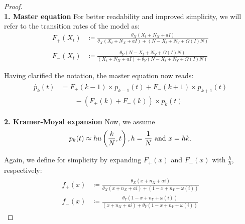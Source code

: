 \documentclass[12pt,a4paper,twoside]{article}
\begin{document}
\begin{proof}\phantom{lol}\\
	\textbf{1. Master equation}\newline
	For better readability and improved simplicity, we will refer to the transition rates of the model as:
	\begin{align*}
	F_+ \left(X_t\right) &\coloneqq\frac{\theta_X (X_t + N_X + aI)}{\theta_X (X_t + N_X + aI) + (N-X_t + N_Y + \Omega\left(I\right) N)} \\
	&\\
	F_- \left(X_t\right) &\coloneqq\frac{\theta_Y(N-X_t + N_Y + \Omega\left(I\right) N)}{(X_t + N_X + aI) + \theta_Y(N-X_t + N_Y + \Omega\left(I\right) N)}
	\end{align*}
	
	Having clarified the notation, the master equation now reads:
	\begin{align}\label{eq:master_eq_my_model}
	\begin{split}
	\dot{p_k}\left(t\right) &= F_+ \left(k-1\right)\times p_{k-1}\left(t\right) + F_- \left(k+1\right)\times p_{k+1}\left(t\right)\\
	&\qquad - \left(F_+\left(k\right) + F_-\left(k\right)\right)\times p_k\left(t\right)
	\end{split}
	\end{align}
	
	\textbf{2. Kramer-Moyal expansion}\newline
	Now, we assume
	\begin{equation}\label{eq:kramer_moyal_assumptions}
	p_k(t) \approx hu\left(\frac{k}{N}, t\right), h=\frac{1}{N}\textnormal{ and }x = hk.
	\end{equation} 
	
	Again, we define for simplicity by expanding $F_+(x)$ and $F_-(x)$ with $\frac{h}{h}$, respectively:
	\begin{align}\label{def:abbreviation_scaled_transition_rates}
	\begin{split}
	f_+(x) &\coloneqq \frac{\theta_X (x+ n_X+ ai)}{\theta_X (x + n_X + ai) + (1-x + n_Y + \omega\left(i\right))}\\
	f_-(x) &\coloneqq \frac{\theta_Y(1-x+n_Y+\omega\left(i\right))}{(x+n_X+ai) + \theta_Y(1-x+n_Y+\omega\left(i\right))}
	\end{split}
	\end{align}
	

\end{proof}
\end{document}
